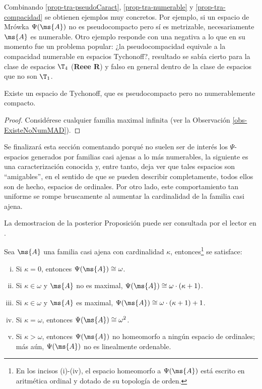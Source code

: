 	Combinando \ref{prop-tra-pseudoCaract}, \ref{prop-tra-numerable} y \ref{prop-tra-compacidad} se obtienen ejemplos muy concretos. Por ejemplo, si un espacio de Mrówka $\Psi(\ms{A})$ no es pseudocompacto pero sí es metrizable, necesariamente $\ms{A}$ es numerable. Otro ejemplo responde con una negativa a lo que en su momento fue un problema popular: ¿la pseudocompacidad equivale a la compacidad numerable en espacios Tychonoff?, resultado se sabía cierto para la clase de espacios $\T_4$ (\textbf{Reee R}) y falso en general dentro de la clase de espacios que no son $\T_1$.
	
	\begin{corolario}\label{cor-EjmPseudoNoNumC}
		Existe un espacio de Tychonoff, que es pseudocompacto pero no numerablemente compacto.
	\end{corolario}
	
	\begin{proof} 
		Considérese cualquier familia maximal infinita (ver la Observación \ref{obs-ExisteNoNumMAD}).
	\end{proof}
	
	Se finalizará esta sección comentando porqué no suelen ser de interés los $\Psi$-espacios generados por familias casi ajenas a lo más numerables, la siguiente es una caracterización conocida y, entre tanto, deja ver que tales espacios son ``amigables'', en el sentido de que se pueden describir completamente, todos ellos son de hecho, espacios de ordinales. Por otro lado, este comportamiento tan uniforme se rompe bruscamente al aumentar la cardinalidad de la familia casi ajena.

	La demostracion de la posterior Proposición puede ser consultada por el lector en \cite[p.~39,45]{GeorginaTesis}.
	
	\begin{proposicion}\label{prop-alomasNumCaract}
		Sea $\ms{A}$ una familia casi ajena con cardinalidad $\kappa$, entonces\footnote{En los incisos (i)-(iv), el espacio homeomorfo a $\Psi(\ms{A})$ está escrito en aritmética ordinal y dotado de su topología de orden.} se satisface:
		\begin{enumerate}[i)]
			\item Si $\kappa=0$, entonces $\Psi(\ms{A}) \cong \omega$.
			\item Si $\kappa \in \omega$ y $\ms{A}$ no es maximal, $\Psi(\ms{A}) \cong \omega \cdot (\kappa+1)$.
			\item Si $\kappa \in \omega$ y $\ms{A}$ es maximal, $\Psi(\ms{A}) \cong \omega \cdot (\kappa+1)+1$.
			\item Si $\kappa=\omega$, entonces $\Psi(\ms{A}) \cong \omega^2$.
			\item Si $\kappa>\omega$, entonces $\Psi(\ms{A})$ no homeomorfo a ningún espacio de ordinales; más aún, $\Psi(\ms{A})$ no es linealmente ordenable.
		\end{enumerate}
	\end{proposicion}
	

